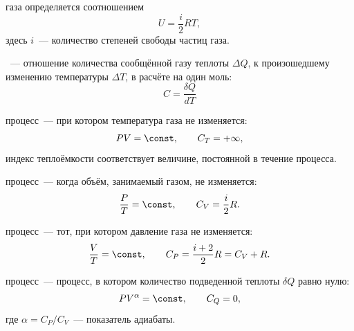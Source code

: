  газа определяется соотношением
\begin{equation}
    U = \frac{i}{2}RT,
\end{equation}
здесь $i$~--- количество степеней свободы частиц газа.

~--- отношение количества сообщённой газу теплоты $\Delta Q$, к произошедшему изменению температуры $\Delta T$, в расчёте на один моль:
\begin{equation}
    C = \frac{\delta Q}{dT}
\end{equation}

 процесс~--- при котором температура газа не изменяется:
\begin{equation}
    PV = \const, \quad\quad C_T = +\infty,
\end{equation}
индекс теплоёмкости соответствует величине, постоянной в течение процесса.

 процесс~--- когда объём, занимаемый газом, не изменяется:
\begin{equation}
    \frac{P}{T} = \const, \quad\quad C_V = \frac{i}{2}R.
\end{equation}

 процесс~--- тот, при котором давление газа не изменяется:
\begin{equation}
    \frac{V}{T} = \const, \quad\quad C_P = \frac{i+2}{2}R = C_V + R.
\end{equation}

 процесс~--- процесс, в котором количество подведенной теплоты $\delta Q$ равно нулю:
\begin{equation}
    P V^\alpha = \const, \quad\quad C_Q = 0,
\end{equation}
где $\alpha = C_P/C_V$~--- показатель адиабаты.
